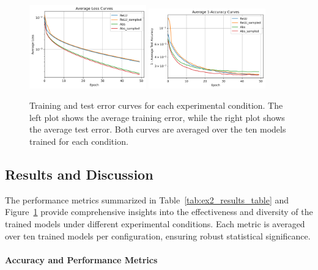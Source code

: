 \begin{figure}[h]
    \centering
    \includegraphics[width=0.45\textwidth]{ex2_training_error.png}
    \includegraphics[width=0.45\textwidth]{ex2_test_accuracy.png}
    \caption{Training and test error curves for each experimental condition. The left plot shows the average training error, while the right plot shows the average test error. Both curves are averaged over the ten models trained for each condition.}
    \label{fig:ex2_training_test_error}
\end{figure}


\subsection{Results and Discussion}
\label{sec:results_discussion}

The performance metrics summarized in Table~\ref{tab:ex2_results_table} and Figure~\ref{fig:ex2_training_test_error} provide comprehensive insights into the effectiveness and diversity of the trained models under different experimental conditions. Each metric is averaged over ten trained models per configuration, ensuring robust statistical significance.

\paragraph{Accuracy and Performance Metrics}

